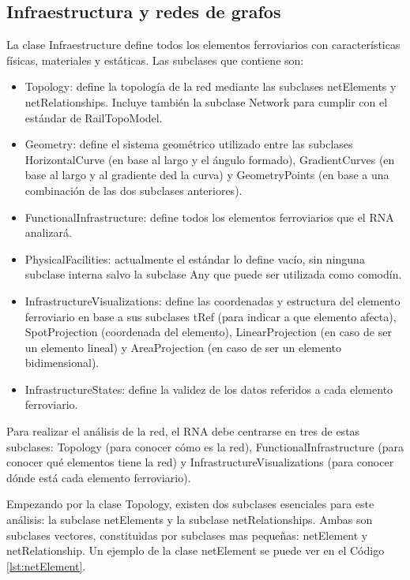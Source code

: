 \subsection{Infraestructura y redes de grafos}
    \label{sec:grafos}

    La clase Infraestructure define todos los elementos ferroviarios con características físicas, materiales y estáticas. Las subclases que contiene son:

    \begin{itemize}
        \item Topology: define la topología de la red mediante las subclases netElements y netRelationships. Incluye también la subclase Network para cumplir con el estándar de RailTopoModel.
        \item Geometry: define el sistema geométrico utilizado entre las subclases HorizontalCurve (en base al largo y el ángulo formado), GradientCurves (en base al largo y al gradiente ded la curva) y GeometryPoints (en base a una combinación de las dos subclases anteriores).
        \item FunctionalInfrastructure: define todos los elementos ferroviarios que el RNA analizará.
        \item PhysicalFacilities: actualmente el estándar lo define vacío, sin ninguna subclase interna salvo la subclase Any que puede ser utilizada como comodín.
        \item InfrastructureVisualizations: define las coordenadas y estructura del elemento ferroviario en base a sus subclases tRef (para indicar a que elemento afecta), SpotProjection (coordenada del elemento), LinearProjection (en caso de ser un elemento lineal) y AreaProjection (en caso de ser un elemento bidimensional).
        \item InfrastructureStates: define la validez de los datos referidos a cada elemento ferroviario.
    \end{itemize}

    Para realizar el análisis de la red, el RNA debe centrarse en tres de estas subclases: Topology (para conocer cómo es la red), FunctionalInfrastructure (para conocer qué elementos tiene la red) y InfrastructureVisualizations (para conocer dónde está cada elemento ferroviario).

    Empezando por la clase Topology, existen dos subclases esenciales para este análisis: la subclase netElements y la subclase netRelationships. Ambas son subclases vectores, constituidas por subclases mas pequeñas: netElement y netRelationship. Un ejemplo de la clase netElement se puede ver en el Código \ref{lst:netElement}.
    
